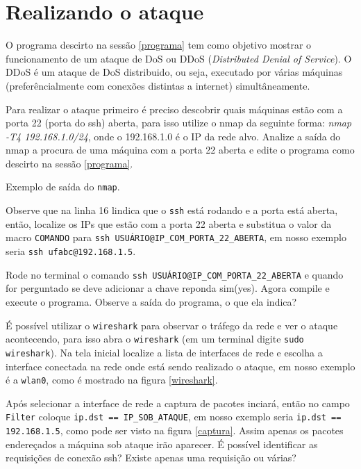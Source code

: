 \documentclass[12pt]{abnt}
\begin{document}
\section{Realizando o ataque}

O programa descirto na sessão \ref{programa} tem como objetivo mostrar o funcionamento de um ataque de
DoS ou DDoS (\textit{Distributed Denial of Service}). O DDoS é um ataque de DoS distribuido, ou seja,
executado por várias máquinas (preferêncialmente com conexões distintas a internet) simultâneamente.

Para realizar o ataque primeiro é preciso descobrir quais máquinas estão com a porta 22 (porta do ssh)
aberta, para isso utilize o nmap da seguinte forma: \textit{nmap -T4 192.168.1.0/24}, onde o 192.168.1.0
é o IP da rede alvo. Analize a saída
do nmap a procura de uma máquina com a porta 22 aberta e edite o programa como descirto na sessão \ref{programa}.

\renewcommand{\baselinestretch}{0.5}  %
\begin{codigo}[!hbt]
   \tiny  %
   \caption{Exemplo de saída do \texttt{nmap}.}
   \label{nmap}
\end{codigo}

Observe que na linha 16 lindica que o \texttt{ssh} está rodando e a porta está aberta, então, localize os IPs que estão com a porta 22 
aberta e substitua o valor da macro \texttt{COMANDO} para \texttt{ssh USUÁRIO@IP\_COM\_PORTA\_22\_ABERTA}, em nosso exemplo seria
\texttt{ssh ufabc@192.168.1.5}. 

Rode no terminal o comando \texttt{ssh USUÁRIO@IP\_COM\_PORTA\_22\_ABERTA} e quando for perguntado se deve adicionar a chave reponda sim(yes).
Agora compile e execute o programa. Observe a saída do programa, o que ela indica?

É possível utilizar o \texttt{wireshark} para observar o tráfego da rede e ver o ataque acontecendo, para isso abra o \texttt{wireshark}
(em um terminal digite \texttt{sudo wireshark}). Na tela inicial localize a lista de interfaces de rede e escolha a interface conectada na
rede onde está sendo realizado o ataque, em nosso exemplo é a \texttt{wlan0}, como é mostrado na figura \ref{wireshark}.

Após selecionar a interface de rede a captura de pacotes inciará, então no campo \texttt{Filter} coloque \texttt{ip.dst == IP\_SOB\_ATAQUE},
em nosso exemplo seria \texttt{ip.dst == 192.168.1.5}, como pode ser visto na figura \ref{captura}. Assim apenas os pacotes endereçados
a máquina sob ataque irão aparecer. É possível identificar as requisições de conexão ssh? Existe apenas uma requisição ou várias?
\end{document}
